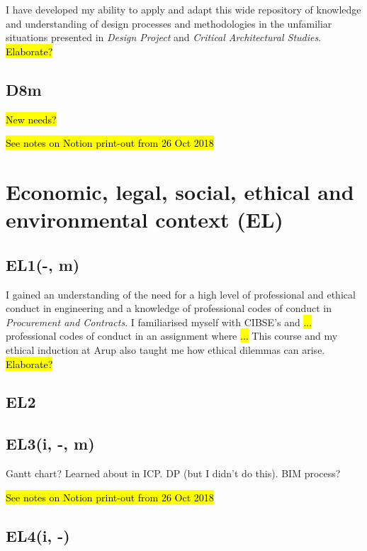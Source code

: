 I have developed my ability to apply and adapt this wide repository of knowledge and understanding of design processes and methodologies in the unfamiliar situations presented in \textit{Design Project} and \textit{Critical Architectural Studies}.
\hl{Elaborate?}


\subsection*{D8m}

\hl{New needs?}

\hl{See notes on Notion print-out from 26 Oct 2018}



\section{Economic, legal, social, ethical and environmental context (EL)}

\subsection*{EL1(-, m)}

I gained an understanding of the need for a high level of professional and ethical conduct in engineering and a knowledge of professional codes of conduct in \textit{Procurement and Contracts}.
I familiarised myself with CIBSE's and \hl{...} professional codes of conduct in an assignment where \hl{...}
This course and my ethical induction at Arup also taught me how ethical dilemmas can arise.
\hl{Elaborate?}


\subsection*{EL2}


\subsection*{EL3(i, -, m)}

Gantt chart? Learned about in ICP.
DP (but I didn't do this).
BIM process?

\hl{See notes on Notion print-out from 26 Oct 2018}


\subsection*{EL4(i, -)}

